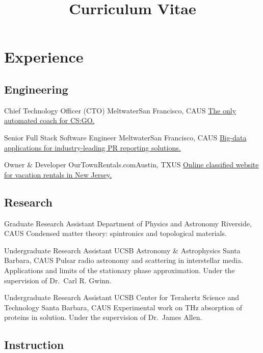 \documentclass[10pt,letter]{moderncv}
\title{Curriculum Vitae}
\begin{document}
  \maketitle

  \section{Experience}

  \subsection{Engineering}

    {Chief Technology Officer (CTO)}
    {Meltwater}{San Francisco, CA}{US}
    {\href{https://pureskill.gg}
      {The only automated coach for CS:GO.}}

    {Senior Full Stack Software Engineer}
    {Meltwater}{San Francisco, CA}{US}
    {\href{https://www.meltwater.com}
      {Big-data applications for industry-leading PR reporting solutions.}}

    {Owner \& Developer}
    {OurTownRentals.com}{Austin, TX}{US}
    {\href{https://ourtownrentals.com}
      {Online classified website for vacation rentals in New Jersey.}}

  \subsection{Research}

    {Graduate Research Assistant}
    {Department of Physics and Astronomy}
    {Riverside, CA}{US}
    {Condensed matter theory: spintronics and topological materials.}

    {Undergraduate Research Assistant}
    {UCSB Astronomy \& Astrophysics}
    {Santa Barbara, CA}{US}
    {Pulsar radio astronomy and scattering in interstellar media.
      Applications and limits of the stationary phase approximation.
      Under the supervision of Dr.~Carl R. Gwinn.}

    {Undergraduate Research Assistant}
    {UCSB Center for Terahertz Science and Technology}
    {Santa Barbara, CA}{US}
    {Experimental work on THz absorption of proteins in solution.
      Under the supervision of Dr.~James Allen.}

  \subsection{Instruction}
\end{document}
